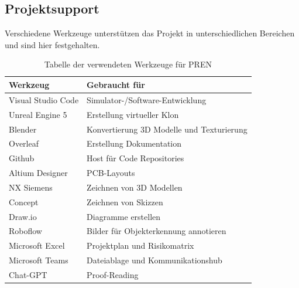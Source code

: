 \documentclass[../main.tex]{subfiles}
\begin{document}
\subsection{Projektsupport}
Verschiedene Werkzeuge unterstützen das Projekt in unterschiedlichen Bereichen und sind hier festgehalten.

\begin{table}[H]
\centering
\begin{tabular}{|l|l|}
\hline
\textbf{Werkzeug} & \textbf{Gebraucht für} \\ \hline
Visual Studio Code & Simulator-/Software-Entwicklung \\ \hline
Unreal Engine 5 & Erstellung virtueller Klon \\ \hline
Blender & Konvertierung 3D Modelle und Texturierung \\ \hline
Overleaf & Erstellung Dokumentation \\ \hline
Github & Host für Code Repositories \\ \hline
Altium Designer & PCB-Layouts \\ \hline
NX Siemens & Zeichnen von 3D Modellen \\ \hline
Concept & Zeichnen von Skizzen \\ \hline
Draw.io & Diagramme erstellen \\ \hline
Roboflow & Bilder für Objekterkennung annotieren \\ \hline
Microsoft Excel & Projektplan und Risikomatrix \\ \hline
Microsoft Teams & Dateiablage und Kommunikationshub \\ \hline
Chat-GPT & Proof-Reading \\ \hline
 
\end{tabular}
\caption{Tabelle der verwendeten Werkzeuge für PREN}
\label{tab:werkzeugtabelle}
\end{table}
\end{document}

